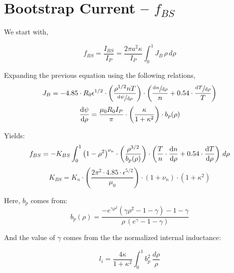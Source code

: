 \section{Bootstrap Current -- $f_{BS}$}

\label{section:pedestalbootstrap}

We start with,

\begin{equation}
	f_{BS} = \frac{I_{BS}}{I_P} = \frac{ 2 \pi a^2 \kappa }{I_P} \int_0^1 J_B \, \rho \, d\rho
\end{equation}

Expanding the previous equation using the following relations,
\begin{equation}
	J_B = -4.85 \cdot R_0 \epsilon^{1/2} \cdot \left( \frac{ \rho^{1/2} n T }{ \sfrac{ \textnormal{d}\psi }{ \textnormal{d}\rho } } \right) \cdot \left( \frac{ \sfrac{ \textnormal{d}n }{ \textnormal{d}\rho } }{ n } + 0.54 \cdot \frac{ \sfrac{ \textnormal{d}T }{ \textnormal{d}\rho } }{ T } \right)
\end{equation}
\begin{equation}
	\frac{ \textnormal{d}\psi }{ \textnormal{d}\rho } = \frac{ \mu_0 R_0 I_P }{ \pi } \cdot \left( \frac{ \kappa}{1+\kappa^2} \right) \cdot b_p(\rho)
\end{equation}

Yields:
\begin{equation}
	f_{BS} = -K_{BS} \int_0^1 \left( 1 - \rho^2  \right)^{\nu_n} \cdot \left( \frac{ \rho^{3/2} }{ b_p(\rho) } \right) \cdot \left( \frac{T}{ n } \cdot  \frac{ \textnormal{d}n }{ \textnormal{d}\rho } + 0.54 \cdot  \frac{ \textnormal{d}T }{ \textnormal{d}\rho }  \right)
 \, d\rho
\end{equation}
\begin{equation}
	K_{BS} = K_n \cdot \left( \frac{ 2 \pi^2 \cdot 4.85 \cdot \epsilon^{5/2} }{\mu_0} \right) \cdot ( 1 + \nu_n ) \cdot ( 1 + \kappa^2 )
\end{equation}

Here, $b_p$ comes from:
\begin{equation}
	b_p(\rho) = \frac{ -e^{\gamma\rho^2} ( \gamma\rho^2 - 1 - \gamma ) - 1 - \gamma }{\rho \,( e^\gamma - 1 - \gamma ) }
\end{equation}

And the value of $\gamma$ comes from the the normalized internal inductance:

\begin{equation}
	l_i = \frac{4 \kappa}{1+\kappa^2}	 \int_0^1 b_p^2 \ \frac{d\rho}{\rho}
\end{equation}

